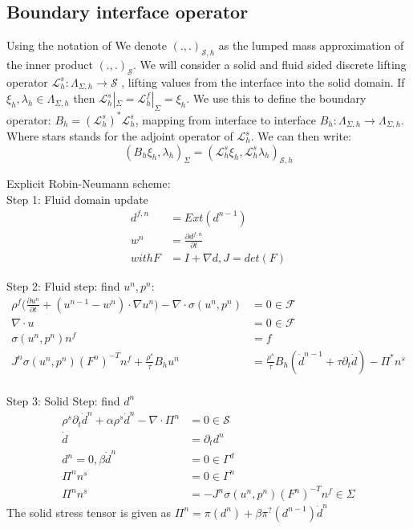 \subsection*{Boundary interface operator}
Using the notation of \cite{Fernandez2015}
We denote $(.,.)_{\mathcal{S},h}$ as the lumped mass approximation of the inner product $(.,.)_{\mathcal{S}}$. We will consider a solid and fluid sided discrete lifting operator $ \mathcal{L}_h^s: \Lambda_{\Sigma, h} \rightarrow \mathcal{S} $ , lifting values from the interface into the solid domain. If $ \xi_h, \lambda_h \in \Lambda_{\Sigma, h}  $ then $\mathcal{L}_h^s |_\Sigma = \mathcal{L}_h^f |_\Sigma = \xi_h  $. We use this to define the boundary operator: $ B_h =(\mathcal{L}_h^s)^* \mathcal{L}_h^s  $, mapping from interface to interface $ B_h : \Lambda_{\Sigma, h} \rightarrow \Lambda_{\Sigma, h}  $.  Where stars stands for the adjoint operator of $ \mathcal{L}_h^s $. We can then write:
$$   ( B_h \xi_h , \lambda_h )_\Sigma = (\mathcal{L}_h^s \xi_h ,\mathcal{L}_h^s \lambda_h)_{\mathcal{S},h} $$


\newpage
Explicit Robin-Neumann scheme: \\
Step 1:
Fluid domain update
\begin{align*}
d^{f,n} &= Ext(d^{n-1}) \\
w^n &= \frac{\partial d^{f,n}}{\partial t} \\
with F &= I + \nabla d, J= det(F)
\end{align*}

Step 2:
Fluid step: find $u^n, p^n$:
\begin{align*}
\rho^f \big( \frac{\partial u^{n}}{\partial t} + ( u^{n-1} - w^n ) \cdot \nabla u^n \big) - \nabla \cdot \sigma(u^n,p^n) &= 0  \in  \mathcal{F} \\
\nabla \cdot u &= 0  \in \mathcal{F} \\
\sigma(u^n, p^n) n^f &= f \\
J^n \sigma(u^n, p^n)(F^n)^{-T}n^f + \frac{\rho^s}{\tau} B_h u^n &= \frac{\rho^s}{\tau} B_h (\dot{d}^{n-1} + \tau \partial_t \dot{d}  ) - \Pi^{*} n^s \\
\end{align*}

Step 3:
Solid Step: find $d^n$
\begin{align*}
\rho^s \partial_t \dot{d}^n + \alpha \rho^s \dot{d}^n - \nabla \cdot \Pi^n &= 0 \in \mathcal{S} \\
\dot{d} &= \partial_t d^n \\
d^n = 0, \beta \dot{d}^n &= 0 \in \Gamma^d  \\
\Pi^n n^s &= 0 \in \Gamma^n \\
\Pi^n n^s &= -J^n \sigma(u^n, p^n) (F^n)^{-T}n^f \in \Sigma 
\end{align*}
The solid stress tensor is given as $ \Pi^n = \pi(d^n) + \beta \pi^{?}(d^{n-1}) \dot{d}^n $
